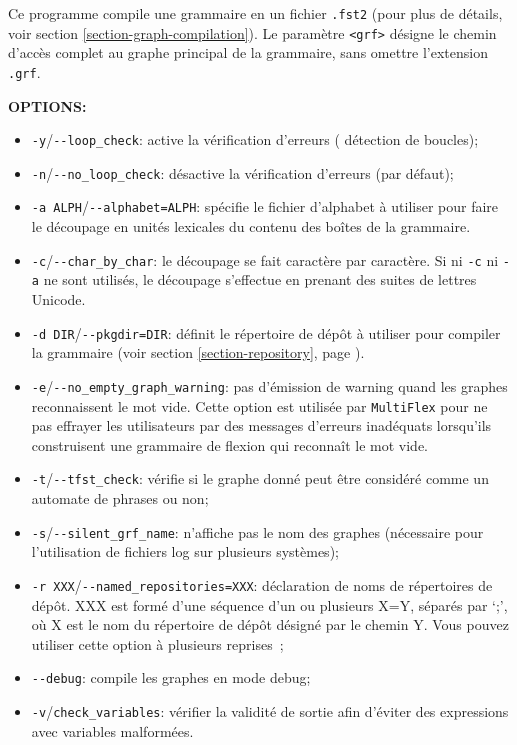 \bigskip
\noindent {}
Ce programme compile une grammaire en un fichier \verb+.fst2+ (pour plus de détails, voir
section \ref{section-graph-compilation}). Le paramètre \verb+<grf>+ désigne le chemin d’accès
complet au graphe principal de la grammaire, sans omettre l’extension \verb+.grf+.

\bigskip
\noindent \textbf{OPTIONS:}
\begin{itemize}
  \item \verb+-y+/\verb+--loop_check+: active la vérification d'erreurs (
		détection de boucles);
  \item \verb+-n+/\verb+--no_loop_check+: désactive la vérification d'erreurs (par défaut);
  \item \verb+-a ALPH+/\verb+--alphabet=ALPH+: spécifie le fichier d’alphabet à utiliser pour faire
  	  le découpage en unités lexicales du contenu des boîtes de la grammaire.

  \item \verb+-c+/\verb+--char_by_char+: le découpage se fait caractère par caractère. Si ni
  	  \verb+-c+ ni \verb+-a+ ne sont utilisés, le découpage s’effectue en prenant des suites de
  	  lettres Unicode.
  \item \verb+-d DIR+/\verb+--pkgdir=DIR+: définit le répertoire de dépôt à utiliser pour compiler
  	  la grammaire (voir section \ref{section-repository}, page \pageref{section-repository}).
  \item \verb+-e+/\verb+--no_empty_graph_warning+: pas d'émission de warning quand les graphes
  	  reconnaissent le mot vide. Cette option est utilisée par \verb+MultiFlex+ pour ne pas
  	  effrayer les utilisateurs par des messages d'erreurs inadéquats lorsqu'ils construisent
  	  une grammaire de flexion qui reconnaît le mot vide.
  \item \verb+-t+/\verb+--tfst_check+: vérifie si le  graphe donné peut être considéré comme un
	automate de phrases ou non;
\item \verb+-s+/\verb+--silent_grf_name+: n'affiche pas le nom des graphes
	(nécessaire pour l'utilisation de fichiers log sur plusieurs systèmes);
\item \verb+-r XXX+/\verb+--named_repositories=XXX+: déclaration de noms de répertoires de dépôt. XXX est formé d'une séquence d'un ou plusieurs X=Y, séparés par `;', où
	X est le nom du répertoire de dépôt désigné par le chemin Y. Vous pouvez utiliser cette option à plusieurs reprises~;
\item \verb+--debug+: compile les graphes en mode  debug;
\item \verb+-v+/\verb+check_variables+: vérifier la validité de sortie afin d'éviter des expressions avec variables malformées.
\end{itemize}

